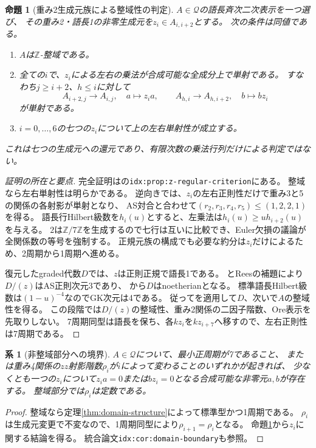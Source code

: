 \documentclass[11pt,a4paper]{ltjsarticle}
\newtheorem{proposition}[theorem]{命題}
\newtheorem{corollary}[theorem]{系}
\theoremstyle{definition}
\newcommand{\ZZ}{\mathbb Z}
\begin{document}
\begin{proposition}[重み2生成元族による整域性の判定]\label{prop:z-regular-criterion}
$A\in\mathcal Q$の語長斉次二次表示を一つ選び、
その重み2・語長1の非零生成元を$z_i\in A_{i,i+2}$とする。
次の条件は同値である。
\begin{enumerate}
\item $A$は$\ZZ$-整域である。
\item 全ての$i$で、$z_i$による左右の乗法が合成可能な全成分上で単射である。
すなわち$j\geq i+2$、$h\leq i$に対して
\[
A_{i+2,j}\longrightarrow A_{i,j},\quad a\longmapsto z_i a,
\qquad
A_{h,i}\longrightarrow A_{h,i+2},\quad b\longmapsto bz_i
\]
が単射である。
\item $i=0,\ldots,6$の七つの$z_i$について上の左右単射性が成立する。
\end{enumerate}
これは七つの生成元への還元であり、有限次数の乗法行列だけによる判定ではない。
\end{proposition}
\begin{proof}[証明の所在と要点]
完全証明はの\texttt{idx:prop:z-regular-criterion}にある。
整域なら左右単射性は明らかである。
逆向きでは、$z_i$の左右正則性だけで重み3と5の関係の各射影が単射となり、
AS対合と合わせて$(r_2,r_3,r_4,r_5)\leq(1,2,2,1)$を得る。
語長行Hilbert級数を$h_i(u)$とすると、左乗法は$h_i(u)\geq u h_{i+2}(u)$を与える。
$2$は$\ZZ/7\ZZ$を生成するので七行は互いに比較でき、Euler欠損の議論が全関係数の等号を強制する。
正規元族の構成でも必要な約分は$z_i$だけによるため、2周期から1周期へ進める。

復元したgraded代数$D$では、$z$は正則正規で語長1である。
\cite[Lemma 1.1]{RZ}とReesの補題により$D/(z)$はAS正則次元3であり、
\cite[Lemma 1.3(c)]{RZ}から$D$はnoetherianとなる。
標準語長Hilbert級数は$(1-u)^{-4}$なのでGK次元は4である。
従って\cite[Lemma 1.3]{LPWZ}を適用して$D$、次いで$A$の整域性を得る。
この段階では$D/(z)$の整域性、重み2関係の二因子階数、Ore表示を先取りしない。
7周期同型は語長を保ち、各$kz_i$を$kz_{i+7}$へ移すので、左右正則性は7周期である。
\end{proof}

\begin{corollary}[非整域部分への境界]\label{cor:domain-boundary}
$A\in\mathcal Q$について、最小正周期が7であること、
または重み4関係の$zz$射影階数$\rho_i$が$i$によって変わることのいずれかが起きれば、
少なくとも一つの$z_i$について$z_i a=0$または$bz_i=0$となる合成可能な非零元$a,b$が存在する。
整域部分では$\rho_i$は定数である。
\end{corollary}
\begin{proof}
整域なら定理\ref{thm:domain-structure}によって標準型かつ1周期である。
$\rho_i$は生成元変更で不変なので、1周期同型により$\rho_{i+1}=\rho_i$となる。
命題\ref{prop:z-regular-criterion}から$z_i$に関する結論を得る。
統合論文\texttt{idx:cor:domain-boundary}も参照。
\end{proof}
\end{document}
